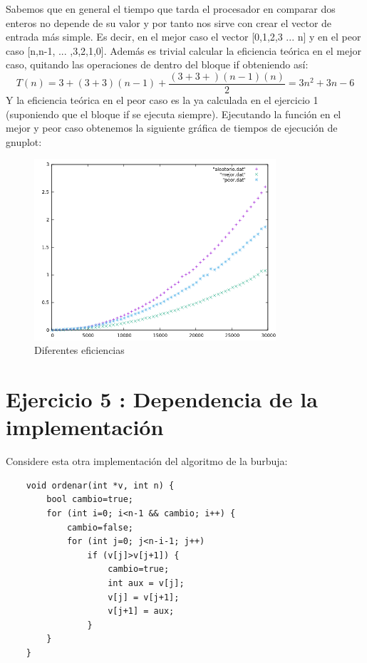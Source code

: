 \documentclass{article}
\begin{document}
Sabemos que en general el tiempo que tarda el procesador en comparar dos enteros no depende de su valor y por tanto nos sirve con crear el vector de entrada más simple. Es decir, en el mejor caso el vector [0,1,2,3 ... n] y en el peor caso [n,n-1, ... ,3,2,1,0]. Además es trivial calcular la eficiencia teórica en el mejor caso, quitando las operaciones de dentro del bloque if obteniendo así:
	\begin{equation}
			T(n) = 3 + (3+3)(n-1) + \frac{(3+3+)(n-1)(n)}{2} = 3n^2 + 3n -6
	\end{equation}
Y la eficiencia teórica en el peor caso es la ya calculada en el ejercicio 1 (suponiendo que el bloque if se ejecuta siempre).
	Ejecutando la función en el mejor y peor caso obtenemos la siguiente gráfica de tiempos de ejecución de gnuplot:
		\begin{figure}[H]
  		\caption{Diferentes eficiencias}
  		\centering
  		\includegraphics[width=0.8\textwidth]{ejer4/grafica.png}
	\end{figure}
	


\clearpage
\section{Ejercicio 5 : Dependencia de la implementación}
Considere esta otra implementación del algoritmo de la burbuja:
\begin{lstlisting}
	void ordenar(int *v, int n) {
		bool cambio=true;
		for (int i=0; i<n-1 && cambio; i++) {
			cambio=false;
			for (int j=0; j<n-i-1; j++)
				if (v[j]>v[j+1]) {
					cambio=true;
					int aux = v[j];
					v[j] = v[j+1];
					v[j+1] = aux;
				}
		}
	}
\end{lstlisting}
\end{document}
